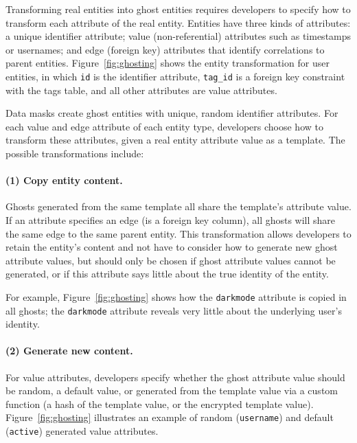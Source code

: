 Transforming real entities into ghost entities requires developers to specify how to transform each
attribute of the real entity.
%
Entities have three kinds of attributes: a unique identifier attribute; value
(non-referential) attributes such as timestamps or usernames; and edge (foreign key)
attributes that identify correlations to parent entities.
%
Figure~\ref{fig:ghosting} shows the entity transformation for user entities, in which \texttt{id} is 
the identifier attribute, 
\texttt{tag\_id} is a foreign key constraint with the tags table, and all other attributes are value
attributes.

Data masks create ghost entities with unique, random identifier attributes.
For each value and edge attribute of each entity type, developers choose how to transform these
attributes, given a real entity attribute value as a template. 
The possible transformations include:

\paragraph{(1) Copy entity content.} Ghosts generated from the same template all share the template's
    attribute value. If an attribute specifies an edge (is a foreign key column), 
    all ghosts will share the same edge to the same parent entity.
    This transformation allows developers to retain the entity's content and not have to
    consider how to generate new ghost attribute values, but 
    should only be chosen if ghost attribute values cannot be generated, or if this
    attribute says little about the true identity of the entity. 

    For example, Figure~\ref{fig:ghosting} shows how the \texttt{darkmode} attribute is copied in
    all ghosts; the \texttt{darkmode} attribute reveals very little about the underlying user's
    identity.

\paragraph{(2) Generate new content.}
        For value attributes, developers specify whether the ghost attribute value should be random,
        a default value, or generated from the template value via a custom function (\eg a hash of
        the template value, or the encrypted template value). Figure~\ref{fig:ghosting} illustrates
        an example of random (\texttt{username}) and default (\texttt{active}) generated value attributes.

